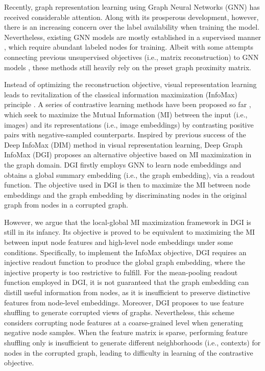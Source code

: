 \documentclass{article}
\theoremstyle{remark}
\begin{document}
Recently, graph representation learning using Graph Neural Networks (GNN) has received considerable attention. Along with its prosperous development, however, there is an increasing concern over the label availability when training the model.
Nevertheless, existing GNN models are mostly established in a supervised manner \cite{Kipf:2016tc,Velickovic:2018we,Hu:2019vq}, which require abundant labeled nodes for training. Albeit with some attempts connecting previous unsupervised objectives (i.e., matrix reconstruction) to GNN models \cite{Kipf:2016ul,Hamilton:2017tp}, these methods still heavily rely on the preset graph proximity matrix.


Instead of optimizing the reconstruction objective, visual representation learning leads to revitalization of the classical information maximization (InfoMax) principle \cite{Linsker:1988ho}. A series of contrastive learning methods have been proposed so far \cite{Wu:2018kw,Tian:2019vw,He:2020tu,Bachman:2019wp,Ye:2019we,Chen:2020wj}, which seek to maximize the Mutual Information (MI) between the input (i.e., images) and its representations (i.e., image embeddings) by contrasting positive pairs with negative-sampled counterparts.
Inspired by previous success of the Deep InfoMax (DIM) method \cite{Bachman:2019wp} in visual representation learning, Deep Graph InfoMax (DGI) \cite{Velickovic:2019tu} proposes an alternative objective based on MI maximization in the graph domain. DGI firstly employs GNN to learn node embeddings and obtains a global summary embedding (i.e., the graph embedding), via a readout function. The objective used in DGI is then to maximize the MI between node embeddings and the graph embedding by discriminating nodes in the original graph from nodes in a corrupted graph.

However, we argue that the local-global MI maximization framework in DGI is still in its infancy. Its objective is proved to be equivalent to maximizing the MI between input node features and high-level node embeddings under some conditions. 
Specifically, to implement the InfoMax objective, DGI requires an injective readout function to produce the global graph embedding, where the injective property is too restrictive to fulfill.
For the mean-pooling readout function employed in DGI, it is not guaranteed that the graph embedding can distill useful information from nodes, as it is insufficient to preserve distinctive features from node-level embeddings.
Moreover, DGI proposes to use feature  shuffling to generate corrupted views of graphs.
Nevertheless, this scheme considers corrupting node features at a coarse-grained level when generating negative node samples. When the feature matrix is sparse, performing feature shuffling only is insufficient to generate different neighborhoods (i.e., contexts) for nodes in the corrupted graph, leading to difficulty in learning of the contrastive objective.
\end{document}
